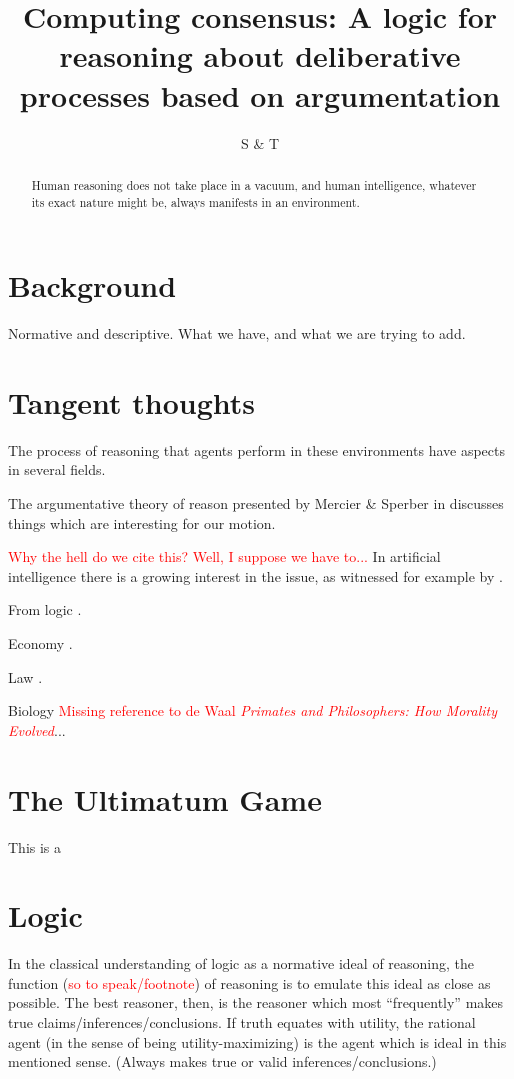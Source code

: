 \documentclass{article}
\title{Computing consensus: A logic for reasoning about deliberative processes based on argumentation}
\author{S \& T}
\newcommand{\todo}[1]{\textcolor{red}{#1}}
\begin{document}
\maketitle

\begin{abstract}
Human reasoning does not take place in a vacuum, and human intelligence, whatever its exact nature might be, always manifests in an environment. 
\end{abstract}

\section{Background}
Normative and descriptive. What we have, and what we are trying to add. 

\section{Tangent thoughts}
The process of reasoning that agents perform in these environments have aspects in several fields. 


The argumentative theory of reason presented by Mercier \& Sperber in \cite{whyreason} discusses things which are interesting for our motion.

\todo{Why the hell do we cite this? Well, I suppose we have to... } In artificial intelligence there is a growing interest in the issue, as witnessed for example by \cite{at}.

From logic \cite{Benthem}.

Economy \cite{ecosoc}.

Law \cite{empire}.

Biology \todo{Missing reference to de Waal \emph{Primates and Philosophers: How Morality Evolved}}...

\section{The Ultimatum Game}
This is a 

\section{Logic}
In the classical understanding of logic as a normative ideal of reasoning, the function (\todo{so to speak/footnote}) of reasoning is to emulate this ideal as close as possible. The best reasoner, then, is the reasoner which most ``frequently'' makes true claims/inferences/conclusions. If truth equates with utility, the rational agent (in the sense of being utility-maximizing) is the agent which is ideal in this mentioned sense. (Always makes true or valid inferences/conclusions.)
\end{document}
